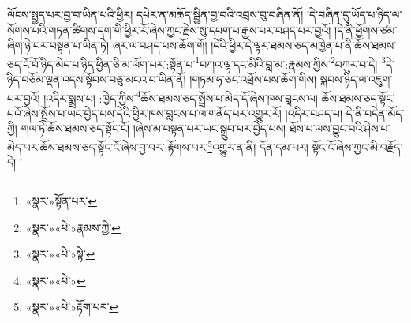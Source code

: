 ལོངས་སྤྱད་པར་བྱ་བ་ཡིན་པའི་ཕྱིར། དཔེར་ན་མཆོད་སྦྱིན་བྱ་བའི་འབྲས་བུ་བཞིན་ནོ། །དེ་བཞིན་དུ་ཡོད་པ་ཉིད་ལ་སོགས་པའི་གཏན་ཚིགས་དག་གི་ཕྱིར་རོ་ཞེས་ཀྱང་རྗེས་སུ་དཔག་པ་རྒྱས་པར་བཤད་པར་བྱའོ། །དེ་ནི་ཕྱོགས་ཙམ་ཞིག་ཉེ་བར་བསྟན་པ་ཡིན་ཏེ། ཞར་ལ་བཤད་པས་ཆོག་གོ། །དེའི་ཕྱིར་དེ་ལྟར་ཐམས་ཅད་མཁྱེན་པ་ནི་ཆོས་ཐམས་ཅད་ངོ་བོ་ཉིད་མེད་པ་ཉིད་ཕྱིན་ཅི་མ་ལོག་པར་:སྟོན་པ་\footnote{«སྣར་»སྟོན་པར་}བཀའ་ལྷ་དང་མིའི་བླ་མ་:རྣམས་ཀྱིས་\footnote{«སྣར་»«པེ་»རྣམས་ཀྱི་}བཀུར་བ་དེ། \footnote{«སྣར་»«པེ་»སྟེ་}དེ་ཉིད་བཅོམ་ལྡན་འདས་སྟོབས་བཅུ་མངའ་བ་ཡིན་ནོ། །གཏམ་ཧ་ཅང་འཕྲོས་པས་ཆོག་གིས། སྐབས་ཉིད་ལ་འཇུག་པར་བྱའོ། །འདིར་སྨྲས་པ། :ཁྱེད་ཀྱིས་\footnote{«སྣར་»«པེ་»}ཆོས་ཐམས་ཅད་སྤྲོས་པ་མེད་དོ་ཞེས་ཁས་བླངས་ལ། ཆོས་ཐམས་ཅད་སྟོང་པའོ་ཞེས་སྤྲོས་པ་ཡང་བྱེད་པས་དེའི་ཕྱིར་ཁས་བླངས་པ་ལ་གནོད་པར་འགྱུར་རོ། །འདིར་བཤད་པ། དེ་ནི་བདེན་མོད་ཀྱི། གལ་ཏེ་ཆོས་ཐམས་ཅད་སྟོང་ངོ། །ཞེས་མ་བསྟན་པར་ཡང་སྒྲུབ་པར་བྱེད་པས། ཐོས་པ་ལས་བྱུང་བའི་ཤེས་པ་མེད་པར་ཆོས་ཐམས་ཅད་སྟོང་ངོ་ཞེས་བྱ་བར་:རྟོགས་པར་\footnote{«སྣར་»«པེ་»རྟོག་པར་}འགྱུར་ན་ནི། དོན་དམ་པར། སྟོང་ངོ་ཞེས་ཀྱང་མི་བརྗོད་དེ། །
